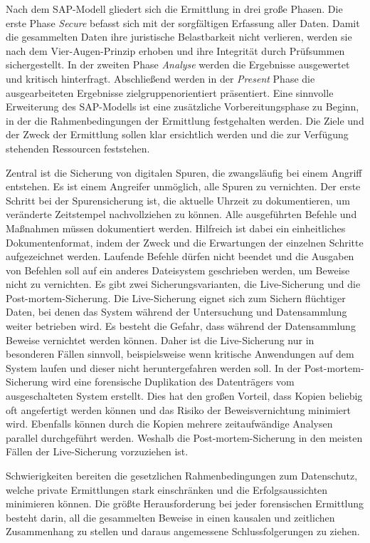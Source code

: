 \documentclass[12pt,DIV=14, version=first, BCOR=10mm,a4paper,twoside,parskip=half-,headsepline,headinclude]{scrartcl}
\begin{document}
Nach dem SAP-Modell gliedert sich die Ermittlung in drei große Phasen. Die erste Phase \textit{Secure} befasst sich mit der sorgfältigen Erfassung aller Daten. Damit die gesammelten Daten ihre juristische Belastbarkeit nicht verlieren, werden sie nach dem Vier-Augen-Prinzip erhoben und ihre Integrität durch Prüfsummen sichergestellt. In der zweiten Phase \textit{Analyse} werden die Ergebnisse ausgewertet und kritisch hinterfragt. Abschließend werden in der \textit{Present} Phase die ausgearbeiteten Ergebnisse zielgruppenorientiert präsentiert. 
Eine sinnvolle Erweiterung des SAP-Modells ist eine zusätzliche Vorbereitungsphase zu Beginn, in der die Rahmenbedingungen der Ermittlung festgehalten werden. Die Ziele und der Zweck der Ermittlung sollen klar ersichtlich werden und die zur Verfügung stehenden Ressourcen feststehen.

Zentral ist die Sicherung von digitalen Spuren, die zwangsläufig bei einem Angriff entstehen. Es ist einem Angreifer unmöglich, alle Spuren zu vernichten. Der erste Schritt bei der Spurensicherung ist, die aktuelle Uhrzeit zu dokumentieren, um veränderte Zeitstempel nachvollziehen zu können. Alle ausgeführten Befehle und Maßnahmen müssen dokumentiert werden. Hilfreich ist dabei ein einheitliches Dokumentenformat, indem der Zweck und die Erwartungen der einzelnen Schritte aufgezeichnet werden. Laufende Befehle dürfen nicht beendet und die Ausgaben von Befehlen soll auf ein anderes Dateisystem geschrieben werden, um Beweise nicht zu vernichten.
Es gibt zwei Sicherungsvarianten, die Live-Sicherung und die Post-mortem-Sicherung. Die Live-Sicherung eignet sich zum Sichern flüchtiger Daten, bei denen das System während der Untersuchung und Datensammlung weiter betrieben wird. Es besteht die Gefahr, dass während der Datensammlung Beweise vernichtet werden können. Daher ist die Live-Sicherung nur in besonderen Fällen sinnvoll, beispielsweise wenn kritische Anwendungen auf dem System laufen und dieser nicht heruntergefahren werden soll. In der Post-mortem-Sicherung wird eine forensische Duplikation des Datenträgers vom ausgeschalteten System erstellt. Dies hat den großen Vorteil, dass Kopien beliebig oft angefertigt werden können und das Risiko der Beweisvernichtung minimiert wird. Ebenfalls können durch die Kopien mehrere zeitaufwändige Analysen parallel durchgeführt werden. Weshalb die Post-mortem-Sicherung in den meisten Fällen der Live-Sicherung vorzuziehen ist.

Schwierigkeiten bereiten die gesetzlichen Rahmenbedingungen zum Datenschutz, welche private Ermittlungen stark einschränken und die Erfolgsaussichten minimieren können. 
Die größte Herausforderung bei jeder forensischen Ermittlung besteht darin, all die gesammelten Beweise in einen kausalen und zeitlichen Zusammenhang zu stellen und daraus angemessene Schlussfolgerungen zu ziehen.

\pagebreak
\printbibliography
\listoffigures
\end{document}
